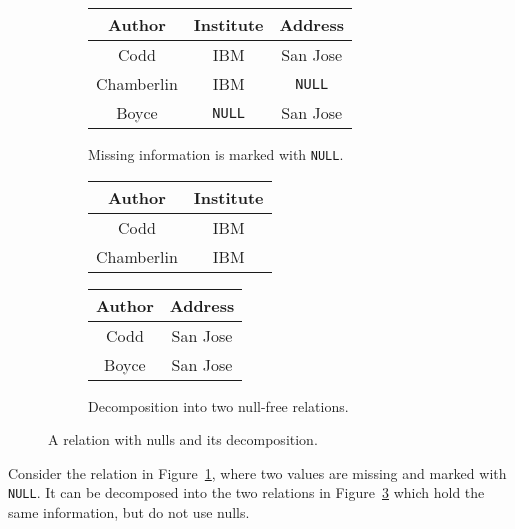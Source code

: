 \documentclass[sigconf,nonacm]{acmart}
\begin{document}

\begin{figure}
\begin{subfigure}{\linewidth}
\centering
\begin{tabular}{|c|c|c|}
\hline
\textsf{Author} & \textsf{Institute} & \textsf{Address} \\ 
\hline
Codd & IBM & San Jose \\
Chamberlin & IBM & \lstinline|NULL| \\
Boyce & \lstinline|NULL| & San Jose \\
\hline
\end{tabular}
\caption{Missing information is marked with \lstinline|NULL|.}
\label{fig:table-null}
\vspace{1em}
\end{subfigure}
\begin{subfigure}{\linewidth}
\centering
\begin{tabular}{|c|c|}
\hline
\textsf{Author} & \textsf{Institute} \\
\hline
Codd & IBM \\
Chamberlin & IBM \\
\hline
\end{tabular}
\hspace{1em}
\begin{tabular}{|c|c|}
\hline
\textsf{Author} & \textsf{Address} \\ 
\hline
Codd & San Jose \\
Boyce & San Jose \\
\hline
\end{tabular}
\caption{Decomposition into two null-free relations.}
\label{fig:table-normalized}
\end{subfigure}
\caption{A relation with nulls and its decomposition.}
\end{figure}

\begin{example}
\label{ex:normalization}
Consider the relation in Figure~\ref{fig:table-null}, 
 where two values are missing and marked with \lstinline|NULL|.
It can be decomposed into the two relations in Figure~\ref{fig:table-normalized}
 which hold the same information, but do not use nulls.
\end{example}
\end{document}
